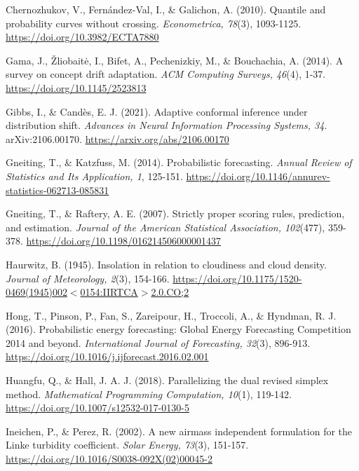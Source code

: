 \documentclass[11pt,a4paper,oneside]{report}
\begin{document}
Chernozhukov, V., Fern\'andez-Val, I., \& Galichon, A. (2010). Quantile and probability curves without crossing. \emph{Econometrica, 78}(3), 1093-1125. \href{https://doi.org/10.3982/ECTA7880}{https://doi.org/10.3982/ECTA7880}

Gama, J., \v{Z}liobait\.e, I., Bifet, A., Pechenizkiy, M., \& Bouchachia, A. (2014). A survey on concept drift adaptation. \emph{ACM Computing Surveys, 46}(4), 1-37. \href{https://doi.org/10.1145/2523813}{https://doi.org/10.1145/2523813}

Gibbs, I., \& Cand\`es, E. J. (2021). Adaptive conformal inference under distribution shift. \emph{Advances in Neural Information Processing Systems, 34}. arXiv:2106.00170. \href{https://arxiv.org/abs/2106.00170}{https://arxiv.org/abs/2106.00170}

Gneiting, T., \& Katzfuss, M. (2014). Probabilistic forecasting. \emph{Annual Review of Statistics and Its Application, 1}, 125-151. \href{https://doi.org/10.1146/annurev-statistics-062713-085831}{https://doi.org/10.1146/annurev-statistics-062713-085831}

Gneiting, T., \& Raftery, A. E. (2007). Strictly proper scoring rules, prediction, and estimation. \emph{Journal of the American Statistical Association, 102}(477), 359-378. \href{https://doi.org/10.1198/016214506000001437}{https://doi.org/10.1198/016214506000001437}

Haurwitz, B. (1945). Insolation in relation to cloudiness and cloud density. \emph{Journal of Meteorology, 2}(3), 154-166. \href{https://doi.org/10.1175/1520-0469(1945)002<0154:IIRTCA>2.0.CO;2}{https://doi.org/10.1175/1520-0469(1945)002$<$0154:IIRTCA$>$2.0.CO;2}

Hong, T., Pinson, P., Fan, S., Zareipour, H., Troccoli, A., \& Hyndman, R. J. (2016). Probabilistic energy forecasting: Global Energy Forecasting Competition 2014 and beyond. \emph{International Journal of Forecasting, 32}(3), 896-913. \href{https://doi.org/10.1016/j.ijforecast.2016.02.001}{https://doi.org/10.1016/j.ijforecast.2016.02.001}

Huangfu, Q., \& Hall, J. A. J. (2018). Parallelizing the dual revised simplex method. \emph{Mathematical Programming Computation, 10}(1), 119-142. \href{https://doi.org/10.1007/s12532-017-0130-5}{https://doi.org/10.1007/s12532-017-0130-5}

Ineichen, P., \& Perez, R. (2002). A new airmass independent formulation for the Linke turbidity coefficient. \emph{Solar Energy, 73}(3), 151-157. \href{https://doi.org/10.1016/S0038-092X(02)00045-2}{https://doi.org/10.1016/S0038-092X(02)00045-2}
\end{document}
